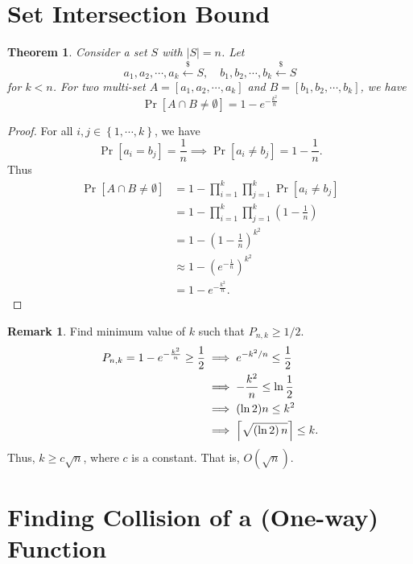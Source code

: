 \documentclass[12pt,openany]{book}
\DeclarePairedDelimiter{\ceil}{\lceil}{\rceil}
\newtheorem{theorem}{Theorem}[chapter]
\theoremstyle{definition}
\newtheorem{remark}{Remark}[chapter]
\newcommand{\set}[1]{\left\{#1\right\}}
\newcommand{\of}[1]{\left( #1 \right)}
\newcommand{\abs}[1]{\left\lvert #1 \right\rvert}
\newcommand{\dollar}{\$}
\newcommand{\uniform}{\xleftarrow{\dollar}}
\begin{document}
	\section{Set Intersection Bound}
	
	\begin{tcolorbox}[colback=white,colframe=thmcolor,arc=5pt,title={\color{white}\bf Set Intersection Bound}]
		\begin{theorem}
			Consider a set $S$ with $\abs{S}=n$. Let \[
			a_1,a_2,\cdots, a_k\uniform S,\quad b_1,b_2,\cdots, b_k\uniform S
			\] for $k<n$. For two multi-set $A=[a_1,a_2,\cdots,a_k]$ and $B=[b_1,b_2,\cdots, b_k]$, we have \[
			\Pr[A\cap B\neq\emptyset]=1-e^{-\frac{k^2}{n}}
			\]
		\end{theorem}
	\end{tcolorbox}
	\begin{proof}
		For all $i,j\in\set{1,\cdots, k}$, we have \[
		\Pr[a_i=b_j]=\frac{1}{n}\implies\Pr[a_i\neq b_j]=1-\frac{1}{n}.
		\] Thus \begin{align*}
			\Pr[A\cap B\neq\emptyset]&=1-\prod_{i=1}^k\prod_{j=1}^k\Pr[a_i\neq b_j]\\
			&=1-\prod_{i=1}^k\prod_{j=1}^k\of{1-\frac{1}{n}}\\
			&=1-\of{1-\frac{1}{n}}^{k^2}\\
			&\approx 1-\of{e^{-\frac{1}{n}}}^{k^2}\\
			&=1-e^{-\frac{k^2}{n}}.
		\end{align*}
	\end{proof}
	
	\begin{remark}
		Find minimum value of $k$ such that $P_{n,k}\geq 1/2$. \begin{align*}
			P_{n,k}=1-e^{-\frac{k^2}{n}}\geq\frac{1}{2}&\implies e^{-k^2/n}\leq\frac{1}{2}\\
			&\implies-\frac{k^2}{n}\leq\ln\frac{1}{2}\\
			&\implies (\ln2)n\leq k^2\\
			&\implies \ceil*{\sqrt{\of{\ln 2}n}}\leq k.
		\end{align*} 
		Thus, $k\geq c\sqrt{n}$, where $c$ is a constant. That is, $O(\sqrt{n})$.
	\end{remark}
	
	\newpage
	\section{Finding Collision of a (One-way) Function}
	
	
	
\end{document}
